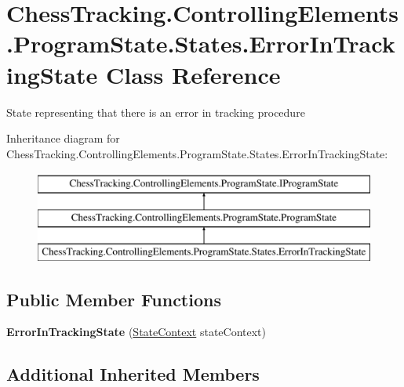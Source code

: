 \hypertarget{class_chess_tracking_1_1_controlling_elements_1_1_program_state_1_1_states_1_1_error_in_tracking_state}{}\section{Chess\+Tracking.\+Controlling\+Elements.\+Program\+State.\+States.\+Error\+In\+Tracking\+State Class Reference}
\label{class_chess_tracking_1_1_controlling_elements_1_1_program_state_1_1_states_1_1_error_in_tracking_state}


State representing that there is an error in tracking procedure  


Inheritance diagram for Chess\+Tracking.\+Controlling\+Elements.\+Program\+State.\+States.\+Error\+In\+Tracking\+State\+:\begin{figure}[H]
\begin{center}
\leavevmode
\includegraphics[height=3.000000cm]{class_chess_tracking_1_1_controlling_elements_1_1_program_state_1_1_states_1_1_error_in_tracking_state}
\end{center}
\end{figure}
\subsection*{Public Member Functions}
\begin{DoxyCompactItemize}
\item 
\mbox{\label{class_chess_tracking_1_1_controlling_elements_1_1_program_state_1_1_states_1_1_error_in_tracking_state_a774badecee9f8e9a4732a68c027c2cf8}} 
{\bfseries Error\+In\+Tracking\+State} (\mbox{\hyperlink{class_chess_tracking_1_1_controlling_elements_1_1_program_state_1_1_state_context}{State\+Context}} state\+Context)
\end{DoxyCompactItemize}
\subsection*{Additional Inherited Members}


